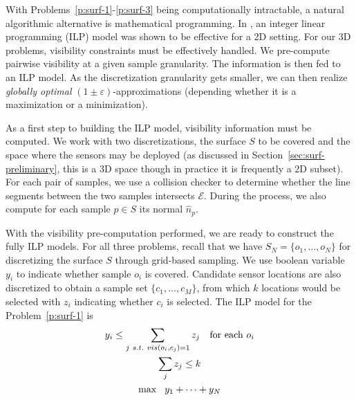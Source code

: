 With Problems~\ref{p:surf-1}-\ref{p:surf-3} being computationally intractable, a natural algorithmic alternative is mathematical programming. In \cite{fengyu2020optimally}, an integer linear programming (ILP) model was shown to be effective for a 2D setting. For our 3D problems, visibility constraints must be effectively handled. We pre-compute pairwise visibility at a given sample granularity. The information is then fed to an ILP model. As the discretization granularity gets smaller, we can then realize \emph{globally optimal} $(1\pm \varepsilon)$-approximations (depending whether it is a maximization or a minimization). 

As a first step to building the ILP model, visibility information must be computed. 
We work with two discretizations, the surface $S$ to be covered and the space where the sensors may be deployed (as discussed in Section~\ref{sec:surf-preliminary}, this is a 3D space though in practice it is frequently a 2D subset). For each pair of samples, we use a collision checker \cite{cgal:aabb-20b} to determine whether the line segments between the two samples intersects $\mathcal E$. During the process, we also compute for each sample $p\in S$ its normal $\hat{n}_p$.


%
With the visibility pre-computation performed, we are ready to construct the fully ILP models. For all three problems, recall that we have $S_N = \{o_1, \ldots, o_N\}$ for discretizing the surface $S$ through grid-based sampling. 
We use boolean variable $y_i$ to indicate whether sample $o_i$ is covered. 
Candidate sensor locations are also discretized to obtain a sample set $\{c_1, \ldots, c_M\}$, from which $k$ locations would be selected with $z_i$ indicating whether $c_i$ is selected. 
The ILP model for the Problem~\ref{p:surf-1} is
\begin{gather}
    y_i   \leq \sum_{j\ s.t.\ vis(o_i, c_j) = 1} z_j   \text{\quad for each } o_i\\
    \sum_j z_j \leq k\\
    \max\ \ y_1 + \dots + y_N
\end{gather}


